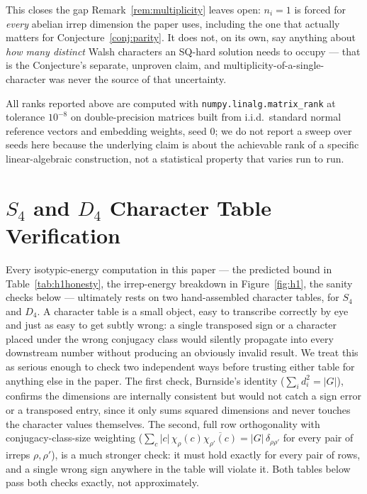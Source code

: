 \documentclass{article}
\begin{document}
This closes the gap Remark~\ref{rem:multiplicity} leaves open: $n_i=1$ is
forced for \emph{every} abelian irrep dimension the paper uses, including
the one that actually matters for Conjecture~\ref{conj:parity}. It does
not, on its own, say anything about \emph{how many distinct} Walsh
characters an SQ-hard solution needs to occupy --- that is the
Conjecture's separate, unproven claim, and multiplicity-of-a-single-character
was never the source of that uncertainty.




All ranks reported above are computed with
\texttt{numpy.linalg.matrix\_rank} at tolerance $10^{-8}$ on
double-precision matrices built from i.i.d.\ standard normal reference
vectors and embedding weights, seed $0$; we do not report a sweep over
seeds here because the underlying claim is about the achievable rank of a
specific linear-algebraic construction, not a statistical property that
varies run to run.

\FloatBarrier
\section{$S_4$ and $D_4$ Character Table Verification}
\label{app:chartables}

Every isotypic-energy computation in this paper --- the predicted bound
in Table~\ref{tab:h1honesty}, the irrep-energy breakdown in
Figure~\ref{fig:h1}, the sanity checks below --- ultimately rests on two
hand-assembled character tables, for $S_4$ and $D_4$. A character table is
a small object, easy to transcribe correctly by eye and just as easy to
get subtly wrong: a single transposed sign or a character placed under
the wrong conjugacy class would silently propagate into every downstream
number without producing an obviously invalid result. We treat this as
serious enough to check two independent ways before trusting either
table for anything else in the paper. The first check, Burnside's
identity ($\sum_i d_i^2 = |G|$), confirms the dimensions are internally
consistent but would not catch a sign error or a transposed entry, since
it only sums squared dimensions and never touches the character values
themselves. The second, full row orthogonality with conjugacy-class-size
weighting ($\sum_{c} |c|\,\chi_{\rho}(c)\overline{\chi_{\rho'}(c)} =
|G|\,\delta_{\rho\rho'}$ for every pair of irreps $\rho,\rho'$), is a much
stronger check: it must hold exactly for every pair of rows, and a single
wrong sign anywhere in the table will violate it. Both tables below pass
both checks exactly, not approximately.
\end{document}
